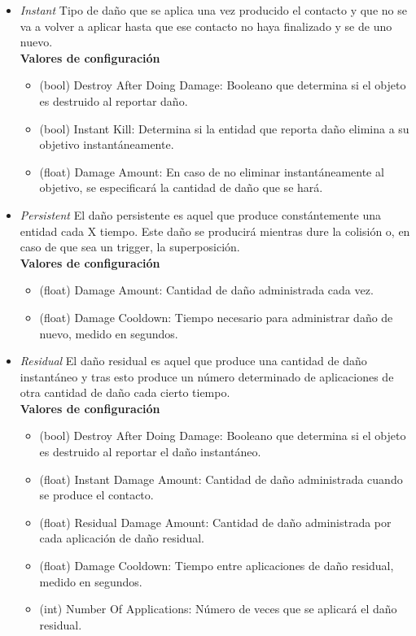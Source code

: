 \begin{itemize}
	\item \textit{Instant}
Tipo de daño que se aplica una vez producido el contacto y que no se va a volver a aplicar hasta que ese contacto no haya finalizado y se de uno nuevo.\\

\textbf{Valores de configuración}
	\begin{itemize}
	        \item (bool) Destroy After Doing Damage: Booleano que determina si el objeto es destruido al reportar daño.
	        \item (bool) Instant Kill: Determina si la entidad que reporta daño elimina a su objetivo instantáneamente.
	        \item (float) Damage Amount: En caso de no eliminar instantáneamente al objetivo, se especificará la cantidad de daño que se hará.
	 \end{itemize}
	\item \textit{Persistent}
El daño persistente es aquel que produce constántemente una entidad cada X tiempo. Este daño se producirá mientras dure la colisión o, en caso de que sea un trigger, la superposición.\\

\textbf{Valores de configuración}
	\begin{itemize}
	        \item (float) Damage Amount: Cantidad de daño administrada cada vez.
	        \item (float) Damage Cooldown: Tiempo necesario para administrar daño de nuevo, medido en segundos.
	\end{itemize}

	\item \textit{Residual}
El daño residual es aquel que produce una cantidad de daño instantáneo y tras esto produce un número determinado de aplicaciones de otra cantidad de daño cada cierto tiempo.\\

\textbf{Valores de configuración}
	\begin{itemize}
	        \item (bool) Destroy After Doing Damage: Booleano que determina si el objeto es destruido al reportar el daño instantáneo.
	        \item (float) Instant Damage Amount: Cantidad de daño administrada cuando se produce el contacto.
	        \item (float) Residual Damage Amount: Cantidad de daño administrada por cada aplicación de daño residual.
	        \item (float) Damage Cooldown: Tiempo entre aplicaciones de daño residual, medido en segundos.
	        \item (int) Number Of Applications: Número de veces que se aplicará el daño residual.
	\end{itemize}
\end{itemize}


